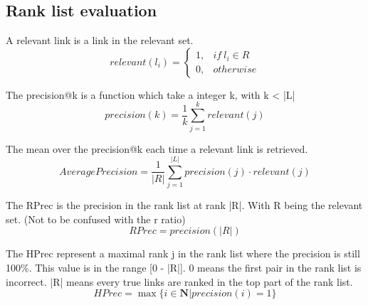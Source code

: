 \subsection{Rank list evaluation}

\begin{definition}
  A relevant link is a link in the relevant set.
  \begin{equation}
    relevant(l_i) =
    \begin{cases}
      1, & if\ l_i \in R \\
      0, & otherwise
    \end{cases}
  \end{equation}
\end{definition}

\begin{definition}
  The precision@k is a function which take a integer k, with k < |L|
  \begin{equation}
    precision(k) = \frac{1}{k} \sum_{j=1}^{k} relevant(j)
  \end{equation}
\end{definition}

\begin{definition}
  The mean over the precision@k each time a relevant link is retrieved.
  \begin{equation}
    AveragePrecision = \frac{1}{|R|} \sum_{j=1}^{|L|} precision(j) \cdot relevant(j)
  \end{equation}
\end{definition}

\begin{definition}
  The RPrec is the precision in the rank list at rank |R|.
  With R being the relevant set. (Not to be confused with the r ratio)
  \begin{equation}
    RPrec = precision(|R|)
  \end{equation}
\end{definition}

\begin{definition}
  The HPrec represent a maximal rank j in the rank list where the precision is still 100\%.
  This value is in the range [0 - |R|].
  0 means the first pair in the rank list is incorrect.
  |R| means every true links are ranked in the top part of the rank list.
  \begin{equation}
    HPrec = \max\{i \in \mathbf{N} | precision(i) = 1\}
  \end{equation}
\end{definition}

